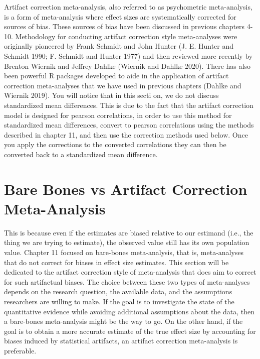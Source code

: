 \documentclass[
  letterpaper,
  DIV=11,
  numbers=noendperiod]{scrreprt}
\begin{document}
Artifact correction meta-analysis, also referred to as psychometric
meta-analysis, is a form of meta-analysis where effect sizes are
systematically corrected for sources of bias. These sources of bias have
been discussed in previous chapters 4-10. Methodology for conducting
artifact correction style meta-analyses were originally pioneered by
Frank Schmidt and John Hunter (J. E. Hunter and Schmidt 1990; F. Schmidt
and Hunter 1977) and then reviewed more recently by Brenton Wiernik and
Jeffrey Dahlke (Wiernik and Dahlke 2020). There has also been powerful R
packages developed to aide in the application of artifact correction
meta-analyses that we have used in previous chapters (Dahlke and Wiernik
2019). You will notice that in this secti on, we do not discuss
standardized mean differences. This is due to the fact that the artifact
correction model is designed for pearson correlations, in order to use
this method for standardized mean differences, convert to pearson
correlations using the methods described in chapter 11, and then use the
correction methods used below. Once you apply the corrections to the
converted correlations they can then be converted back to a standardized
mean difference.

\hypertarget{bare-bones-vs-artifact-correction-meta-analysis}{%
\section{Bare Bones vs Artifact Correction
Meta-Analysis}\label{bare-bones-vs-artifact-correction-meta-analysis}}

This is because even if the estimates are biased relative to our
estimand (i.e., the thing we are trying to estimate), the observed value
still has its own population value. Chapter 11 focused on bare-bones
meta-analysis, that is, meta-analyses that do not correct for biases in
effect size estimates. This section will be dedicated to the artifact
correction style of meta-analysis that does aim to correct for such
artifactual biases. The choice between these two types of meta-analyses
depends on the research question, the available data, and the
assumptions researchers are willing to make. If the goal is to
investigate the state of the quantitative evidence while avoiding
additional assumptions about the data, then a bare-bones meta-analysis
might be the way to go. On the other hand, if the goal is to obtain a
more accurate estimate of the true effect size by accounting for biases
induced by statistical artifacts, an artifact correction meta-analysis
is preferable.
\end{document}
